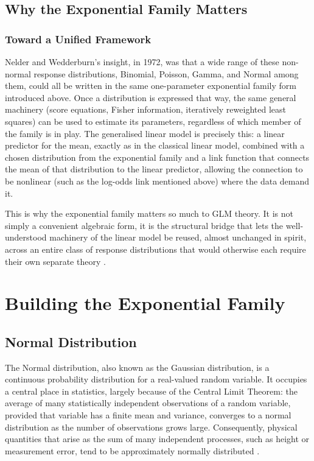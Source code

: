 \section{Why the Exponential Family Matters}

\subsection*{Toward a Unified Framework}
Nelder and Wedderburn's insight, in 1972, was that a wide range of these non-normal response distributions, Binomial, Poisson, Gamma, and Normal among them, could all be written in the same one-parameter exponential family form introduced above. Once a distribution is expressed that way, the same general machinery (score equations, Fisher information, iteratively reweighted least squares) can be used to estimate its parameters, regardless of which member of the family is in play. The generalised linear model is precisely this: a linear predictor for the mean, exactly as in the classical linear model, combined with a chosen distribution from the exponential family and a link function that connects the mean of that distribution to the linear predictor, allowing the connection to be nonlinear (such as the log-odds link mentioned above) where the data demand it.

This is why the exponential family matters so much to GLM theory. It is not simply a convenient algebraic form, it is the structural bridge that lets the well-understood machinery of the linear model be reused, almost unchanged in spirit, across an entire class of response distributions that would otherwise each require their own separate theory \citep{nelder1972,dobson2018}.

\Reflection
\tbc

\Application
\tbc


\chapter{Building the Exponential Family}

\Exploration
\tbc

\Cognition

\section{Normal Distribution}
The Normal distribution, also known as the Gaussian distribution, is a continuous probability distribution for a real-valued random variable. It occupies a central place in statistics, largely because of the Central Limit Theorem: the average of many statistically independent observations of a random variable, provided that variable has a finite mean and variance, converges to a normal distribution as the number of observations grows large. Consequently, physical quantities that arise as the sum of many independent processes, such as height or measurement error, tend to be approximately normally distributed \citep{casella2002}.

